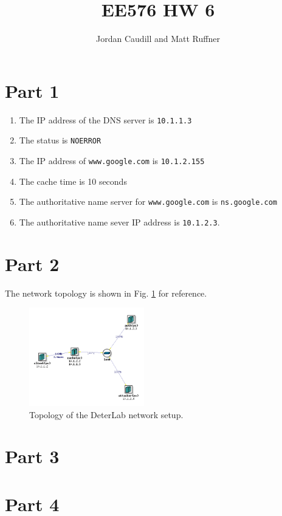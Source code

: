 \documentclass[letterpaper]{article}
\title{EE576 HW 6}
\author{Jordan Caudill and Matt Ruffner}
\begin{document}
\maketitle


\section{Part 1}

\begin{enumerate}
    \item The IP address of the DNS server is \texttt{10.1.1.3}
    \item The status is \texttt{NOERROR}
    \item The IP address of \texttt{www.google.com} is \texttt{10.1.2.155}
    \item The cache time is 10 seconds
    \item The authoritative name server for \texttt{www.google.com} is \texttt{ns.google.com}
    \item The authoritative name sever IP address is \texttt{10.1.2.3}.
\end{enumerate}

\section{Part 2}

The network topology is shown in Fig. \ref{fig:topo} for reference.
\begin{figure}[h!]
    \centering
    \includegraphics[width=5cm]{images/hw7topo}
    \caption{Topology of the DeterLab network setup.}
    \label{fig:topo}
\end{figure}

\section{Part 3}

\section{Part 4}
\end{document}
